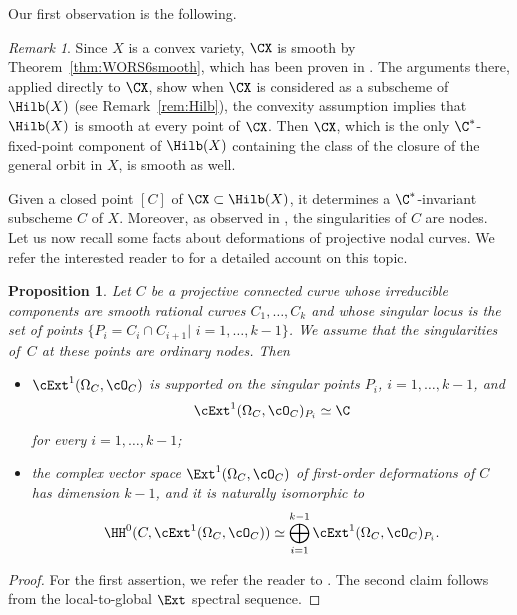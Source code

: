 \documentclass[11pt]{amsart}
\numberwithin{equation}{section}
\newtheorem{proposition}[theorem]{Proposition}
\theoremstyle{definition}
\theoremstyle{remark}
\newtheorem{remark}[theorem]{Remark}
\begin{document}
Our first observation is the following. 

\begin{remark}\label{rem:Hilb2}
Since $X$ is a convex variety, $\CX$  is smooth by Theorem~\ref{thm:WORS6smooth}, which has been proven in \cite[Proposition~6.4]{WORS6}. The arguments there, applied directly to $\CX$, show when $\CX$ is considered as a subscheme of $\Hilb(X)$ (see Remark~\ref{rem:Hilb}), the convexity assumption implies that $\Hilb(X)$ is smooth at every point of $\CX$. Then $\CX$, which is the only $\C^*$-fixed-point component of $\Hilb(X)$ containing the class of the closure of the general orbit in $X$, is smooth as well.
\end{remark}

Given a closed point $[C]$ of $\CX\subset \Hilb(X)$, it determines a $\C^*$-invariant subscheme $C$ of $X$. Moreover, as observed in \cite[Proof of Proposition 6.4]{WORS6}, the singularities of $C$ are nodes. Let us now recall some facts about deformations of projective nodal curves. We refer the interested reader to \cite[Section~6]{Talpo} for a detailed account on this topic.

\begin{proposition}\label{prop:deforms}
Let $C$ be a projective connected curve whose irreducible components are smooth rational curves $C_1,\dots, C_k$ and whose singular locus is the set of points $\{P_i=C_{i}\cap C_{i+1}|\,\,i=1,\dots,k-1\}$. We assume that the singularities of\, $C$ at these points are ordinary nodes. Then 
\begin{itemize}[leftmargin=25pt]
\item $\cExt^1(\Omega_C,\cO_C)$ is supported on the singular points $P_i$, $i=1,\dots,k-1$, and $$\cExt^1(\Omega_C,\cO_C)_{P_i}\simeq \C$$
for every $i=1,\dots,k-1$;
\item the complex vector space $\Ext^1(\Omega_C,\cO_C)$ of first-order deformations of $C$  has dimension $k-1$, and it is naturally isomorphic to
\[
\HH^0(C,\cExt^1(\Omega_C,\cO_C))\simeq \bigoplus_{i=1}^{k-1}\cExt^1(\Omega_C,\cO_C)_{P_i}.
\]
\end{itemize}
\end{proposition}

\begin{proof}
For the first assertion, we refer the reader to \cite[Remark~6.4.2]{Talpo}. The second claim follows from the local-to-global
$\Ext$ spectral sequence.
\end{proof}
\end{document}
